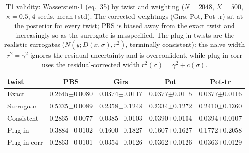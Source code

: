 \begin{table}[ht]
\centering
\caption{T1 validity: Wasserstein-1 (eq.~35) by twist and weighting ($N=2048$, $K=500$, $\kappa=0.5$, 4 seeds, mean$\pm$std).  The corrected weightings (Girs, Pot, Pot-tr) sit at the posterior for every twist; PBS is biased away from the exact twist and increasingly so as the surrogate is misspecified.  The plug-in twists are the realistic surrogates ($N(y; D(x,\sigma), r^2)$, terminally consistent): the naive width $r^2=\gamma^2$ ignores the residual uncertainty and is overconfident, while plug-in corr uses the residual-corrected width $r^2(\sigma)=\gamma^2+\bar c(\sigma)$.}
\label{tab:toy_t1}
\begin{tabular}{lcccc}
\toprule
twist & PBS & Girs & Pot & Pot-tr \\
\midrule
Exact & 0.2645$\pm$0.0080 & 0.0374$\pm$0.0117 & 0.0377$\pm$0.0115 & 0.0377$\pm$0.0116 \\
Surrogate & 0.5335$\pm$0.0089 & 0.2358$\pm$0.1248 & 0.2334$\pm$0.1272 & 0.2410$\pm$0.1360 \\
Consistent & 0.2865$\pm$0.0077 & 0.0385$\pm$0.0103 & 0.0390$\pm$0.0104 & 0.0394$\pm$0.0107 \\
Plug-in & 0.3884$\pm$0.0102 & 0.1600$\pm$0.1827 & 0.1607$\pm$0.1627 & 0.1772$\pm$0.2058 \\
Plug-in corr & 0.2863$\pm$0.0101 & 0.0354$\pm$0.0126 & 0.0362$\pm$0.0126 & 0.0363$\pm$0.0129 \\
\bottomrule
\end{tabular}
\end{table}
